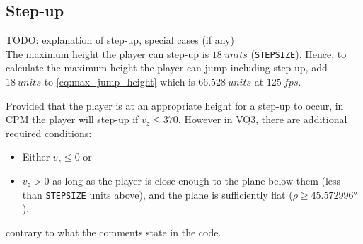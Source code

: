 \subsection{Step-up}
\label{sec:stepup}
TODO: explanation of step-up, special cases (if any)\\
The maximum height the player can step-up is $\qty{18}{units}$ (\texttt{STEPSIZE}).
Hence, to calculate the maximum height the player can jump including step-up, add $\qty{18}{units}$ to \eqref{eq:max_jump_height} %
which is $\qty{66.528}{units}$ at $\qty{125}{fps}$.

Provided that the player is at an appropriate height for a step-up to occur, in CPM the player will step-up if $v_z \le 370$.
However in VQ3, there are additional required conditions:
\begin{itemize}
\item
Either $v_z \le 0$ or
\item
$v_z > 0$ as long as the player is close enough to the plane below them (less than \texttt{STEPSIZE} units above), and the plane is sufficiently flat ($\rho \ge \ang{45.572996}$),
\end{itemize}
contrary to what the comments state in the code.


